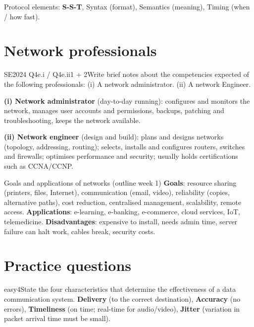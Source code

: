 \documentclass[10pt]{article}
\begin{document}
\begin{mnemonic}
Protocol elements: \textbf{S-S-T}, Syntax (format), Semantics (meaning), Timing (when / how fast).
\end{mnemonic}

\section{Network professionals}

\begin{pastq}{SE2024 Q4e.i \textnormal{/} Q4e.ii}{1 + 2}Write brief notes about the competencies expected of the following professionals: (i) A network administrator. (ii) A network Engineer.\end{pastq}
\begin{ans}
\textbf{(i) Network administrator} (day-to-day running): configures and monitors the network, manages user accounts and permissions, backups, patching and troubleshooting, keeps the network available.

\textbf{(ii) Network engineer} (design and build): plans and designs networks (topology, addressing, routing); selects, installs and configures routers, switches and firewalls; optimises performance and security; usually holds certifications such as CCNA/CCNP.
\end{ans}

\begin{keydef}{Goals and applications of networks (outline week 1)}
\textbf{Goals}: resource sharing (printers, files, Internet), communication (email, video), reliability (copies, alternative paths), cost reduction, centralised management, scalability, remote access.
\textbf{Applications}: e-learning, e-banking, e-commerce, cloud services, IoT, telemedicine.
\textbf{Disadvantages}: expensive to install, needs admin time, server failure can halt work, cables break, security costs.
\end{keydef}

\section{Practice questions}
\setcounter{pq}{0}

\begin{practice}{easy}{4}State the four characteristics that determine the effectiveness of a data communication system.
\sol \textbf{Delivery} (to the correct destination), \textbf{Accuracy} (no errors), \textbf{Timeliness} (on time; real-time for audio/video), \textbf{Jitter} (variation in packet arrival time must be small).
\end{practice}
\end{document}
